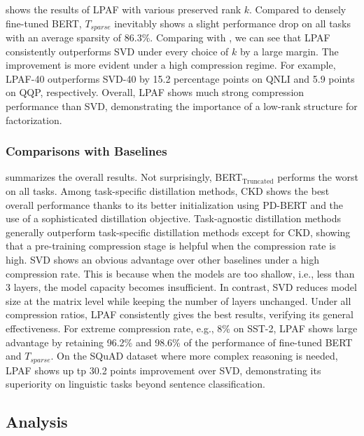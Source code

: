  shows the results of LPAF with various preserved rank $k$. 
Compared to densely fine-tuned BERT, $T_{sparse}$ inevitably shows a slight performance drop 
on all tasks with an average sparsity of 86.3\%.
Comparing  with , we can see that LPAF consistently outperforms SVD under every choice of $k$ by a large margin. The improvement is more evident under a high compression regime. For example, LPAF-40 outperforms SVD-40 by 15.2 percentage 
points on QNLI and 5.9 points on QQP, respectively. Overall, LPAF shows much strong 
compression performance than SVD, demonstrating the importance of a 
low-rank structure for factorization.


\subsubsection{Comparisons with Baselines}
 summarizes the overall results. Not surprisingly, BERT$_{\text{Truncated}}$ performs the worst on all tasks. Among task-specific distillation methods, CKD shows the best overall performance thanks to its better initialization using PD-BERT and the use of a sophisticated distillation objective. Task-agnostic distillation methods generally outperform task-specific distillation methods except for CKD, showing that a pre-training compression stage is helpful when the compression rate is high. SVD shows an obvious advantage over other baselines under a high compression rate. This is because when the models are too shallow, i.e.,  less than 3 layers, the model capacity becomes insufficient. In contrast, SVD reduces model size at the matrix level while keeping the number of layers unchanged. Under all compression ratios, LPAF consistently gives the best results, verifying its general effectiveness. For extreme compression rate, e.g., 8\%  on SST-2, LPAF shows large advantage by retaining 96.2\% and 98.6\% of the performance of fine-tuned BERT and $T_{sparse}$. On the SQuAD dataset where more complex reasoning is needed, LPAF shows up tp 30.2 points improvement over SVD, demonstrating its superiority on linguistic tasks beyond sentence classification.

\subsection{Analysis}
\label{sec:analysis}
